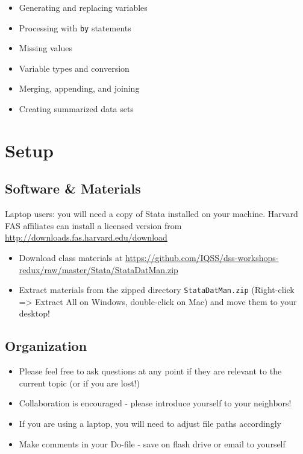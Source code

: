 \documentclass[]{book}
\providecommand{\tightlist}{%
  \setlength{\itemsep}{0pt}\setlength{\parskip}{0pt}}
\begin{document}
\begin{itemize}
\tightlist
\item
  Generating and replacing variables
\item
  Processing with \texttt{by} statements
\item
  Missing values
\item
  Variable types and conversion
\item
  Merging, appending, and joining
\item
  Creating summarized data sets
\end{itemize}

\section{Setup}\label{setup-7}

\subsection{Software \& Materials}\label{software-materials-7}

Laptop users: you will need a copy of Stata installed on your machine.
Harvard FAS affiliates can install a licensed version from
\url{http://downloads.fas.harvard.edu/download}

\begin{itemize}
\tightlist
\item
  Download class materials at
  \url{https://github.com/IQSS/dss-workshops-redux/raw/master/Stata/StataDatMan.zip}
\item
  Extract materials from the zipped directory \texttt{StataDatMan.zip}
  (Right-click =\textgreater{} Extract All on Windows, double-click on
  Mac) and move them to your desktop!
\end{itemize}

\subsection{Organization}\label{organization-1}

\begin{itemize}
\tightlist
\item
  Please feel free to ask questions at any point if they are relevant to
  the current topic (or if you are lost!)
\item
  Collaboration is encouraged - please introduce yourself to your
  neighbors!
\item
  If you are using a laptop, you will need to adjust file paths
  accordingly
\item
  Make comments in your Do-file - save on flash drive or email to
  yourself
\end{itemize}
\end{document}
